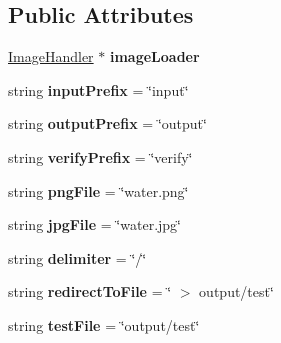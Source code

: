 \subsection*{Public Attributes}
\begin{DoxyCompactItemize}
\item 
\hypertarget{classFilterToolTest_a4e930ca47e70a7590fbcc6928ff3646f}{\hyperlink{classImageHandler}{Image\-Handler} $\ast$ {\bfseries image\-Loader}}\label{classFilterToolTest_a4e930ca47e70a7590fbcc6928ff3646f}

\item 
\hypertarget{classFilterToolTest_a0e07e2b9e93ee95c13b40e647b442f92}{string {\bfseries input\-Prefix} = \char`\"{}input\char`\"{}}\label{classFilterToolTest_a0e07e2b9e93ee95c13b40e647b442f92}

\item 
\hypertarget{classFilterToolTest_a0c4953ea2ad21dfad714233f7c62a402}{string {\bfseries output\-Prefix} = \char`\"{}output\char`\"{}}\label{classFilterToolTest_a0c4953ea2ad21dfad714233f7c62a402}

\item 
\hypertarget{classFilterToolTest_ad302be4e310ea8f6dee6a9e1be72f654}{string {\bfseries verify\-Prefix} = \char`\"{}verify\char`\"{}}\label{classFilterToolTest_ad302be4e310ea8f6dee6a9e1be72f654}

\item 
\hypertarget{classFilterToolTest_a092ca517cd61c8921950193657ea3a1a}{string {\bfseries png\-File} = \char`\"{}water.\-png\char`\"{}}\label{classFilterToolTest_a092ca517cd61c8921950193657ea3a1a}

\item 
\hypertarget{classFilterToolTest_a9d52fc74910157a1fdbb9b385e6e4d2a}{string {\bfseries jpg\-File} = \char`\"{}water.\-jpg\char`\"{}}\label{classFilterToolTest_a9d52fc74910157a1fdbb9b385e6e4d2a}

\item 
\hypertarget{classFilterToolTest_a51daa1e52565ece097b9f8c646b93823}{string {\bfseries delimiter} = \char`\"{}/\char`\"{}}\label{classFilterToolTest_a51daa1e52565ece097b9f8c646b93823}

\item 
\hypertarget{classFilterToolTest_a60811ae01a8e38ada03c91781bcb4d7b}{string {\bfseries redirect\-To\-File} = \char`\"{} $>$ output/test\char`\"{}}\label{classFilterToolTest_a60811ae01a8e38ada03c91781bcb4d7b}

\item 
\hypertarget{classFilterToolTest_a13ec6af4a2cf388c7296c1d7acb2b41f}{string {\bfseries test\-File} = \char`\"{}output/test\char`\"{}}\label{classFilterToolTest_a13ec6af4a2cf388c7296c1d7acb2b41f}


\end{DoxyCompactItemize}
